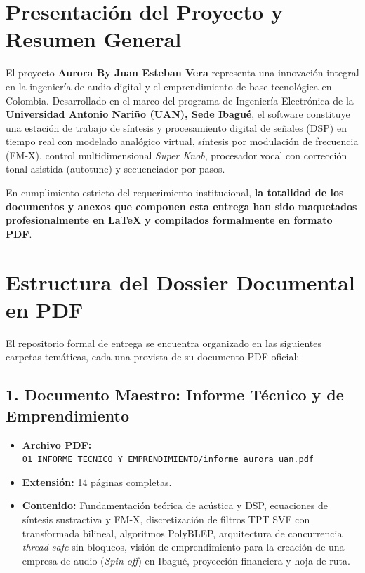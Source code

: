 \documentclass[11pt,a4paper]{article}
\begin{document}
\newpage
\tableofcontents
\newpage

\section{Presentación del Proyecto y Resumen General}

El proyecto \textbf{Aurora By Juan Esteban Vera} representa una innovación integral en la ingeniería de audio digital y el emprendimiento de base tecnológica en Colombia. Desarrollado en el marco del programa de Ingeniería Electrónica de la \textbf{Universidad Antonio Nariño (UAN), Sede Ibagué}, el software constituye una estación de trabajo de síntesis y procesamiento digital de señales (DSP) en tiempo real con modelado analógico virtual, síntesis por modulación de frecuencia (FM-X), control multidimensional \textit{Super Knob}, procesador vocal con corrección tonal asistida (autotune) y secuenciador por pasos.

En cumplimiento estricto del requerimiento institucional, \textbf{la totalidad de los documentos y anexos que componen esta entrega han sido maquetados profesionalmente en \LaTeX{} y compilados formalmente en formato PDF}.

\section{Estructura del Dossier Documental en PDF}

El repositorio formal de entrega se encuentra organizado en las siguientes carpetas temáticas, cada una provista de su documento PDF oficial:

\subsection{1. Documento Maestro: Informe Técnico y de Emprendimiento}
\begin{itemize}[leftmargin=1.5cm]
    \item \textbf{Archivo PDF:} \texttt{01\_INFORME\_TECNICO\_Y\_EMPRENDIMIENTO/informe\_aurora\_uan.pdf}
    \item \textbf{Extensión:} 14 páginas completas.
    \item \textbf{Contenido:} Fundamentación teórica de acústica y DSP, ecuaciones de síntesis sustractiva y FM-X, discretización de filtros TPT SVF con transformada bilineal, algoritmos PolyBLEP, arquitectura de concurrencia \textit{thread-safe} sin bloqueos, visión de emprendimiento para la creación de una empresa de audio (\textit{Spin-off}) en Ibagué, proyección financiera y hoja de ruta.
\end{itemize}
\end{document}
